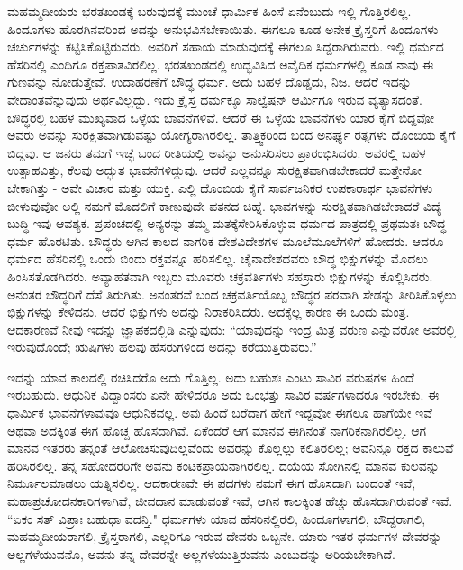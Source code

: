 ಮಹಮ್ಮದೀಯರು ಭರತಖಂಡಕ್ಕೆ ಬರುವುದಕ್ಕೆ ಮುಂಚೆ ಧಾರ್ಮಿಕ ಹಿಂಸೆ ಏನೆಂಬುದು ಇಲ್ಲಿ ಗೊತ್ತಿರಲಿಲ್ಲ. ಹಿಂದೂಗಳು ಹೊರಗಿನವರಿಂದ ಅದನ್ನು ಅನುಭವಿಸಬೇಕಾಯಿತು. ಈಗಲೂ ಕೂಡ ಅನೇಕ ಕ್ರೈಸ್ತರಿಗೆ ಹಿಂದೂಗಳು ಚರ್ಚುಗಳನ್ನು ಕಟ್ಟಿಸಿಕೊಟ್ಟಿರುವರು. ಅವರಿಗೆ ಸಹಾಯ ಮಾಡುವುದಕ್ಕೆ ಈಗಲೂ ಸಿದ್ದರಾಗಿರುವರು. ಇಲ್ಲಿ ಧರ್ಮದ ಹೆಸರಿನಲ್ಲಿ ಎಂದಿಗೂ ರಕ್ತಪಾತವಿರಲಿಲ್ಲ. ಭರತಖಂಡದಲ್ಲಿ ಉದ್ಭವಿಸಿದ ಅವೈದಿಕ ಧರ್ಮಗಳಲ್ಲಿ ಕೂಡ ನಾವು ಈ ಗುಣವನ್ನು ನೋಡುತ್ತೇವೆ. ಉದಾಹರಣೆಗೆ ಬೌದ್ಧ ಧರ್ಮ. ಅದು ಬಹಳ ದೊಡ್ಡದು, ನಿಜ. ಆದರೆ ಇದನ್ನು ವೇದಾಂತವೆನ್ನುವುದು ಅರ್ಥವಿಲ್ಲದ್ದು. ಇದು ಕ್ರೈಸ್ತ ಧರ್ಮಕ್ಕೂ ಸಾಲ್ವೆಷನ್ ಆರ್ಮಿಗೂ ಇರುವ ವ್ಯತ್ಯಾಸದಂತೆ. ಬೌದ್ಧರಲ್ಲಿ ಬಹಳ ಮುಖ್ಯವಾದ ಒಳ್ಳೆಯ ಭಾವನೆಗಳಿವೆ. ಆದರೆ ಈ ಒಳ್ಳೆಯ ಭಾವನೆಗಳು ಯಾರ ಕೈಗೆ ಬಿದ್ದವೋ ಅವರು ಅವನ್ನು ಸುರಕ್ಷಿತವಾಗಿಡುವಷ್ಟು ಯೋಗ್ಯರಾಗಿರಲಿಲ್ಲ. ತಾತ್ತ್ವಿಕರಿಂದ ಬಂದ ಅನರ್ಘ್ಯ ರತ್ನಗಳು ದೊಂಬಿಯ ಕೈಗೆ ಬಿದ್ದವು. ಆ ಜನರು ತಮಗೆ ಇಚ್ಛೆ ಬಂದ ರೀತಿಯಲ್ಲಿ ಅವನ್ನು ಅನುಸರಿಸಲು ಪ್ರಾರಂಭಿಸಿದರು. ಅವರಲ್ಲಿ ಬಹಳ ಉತ್ಸಾಹವಿತ್ತು, ಕೆಲವು ಅದ್ಭುತ ಭಾವನೆಗಳಿದ್ದುವು. ಆದರೆ ಎಲ್ಲವನ್ನೂ ಸುರಕ್ಷಿತವಾಗಿಡಬೇಕಾದರೆ ಮತ್ತೇನೋ ಬೇಕಾಗಿತ್ತು - ಅವೇ ವಿಚಾರ ಮತ್ತು ಯುಕ್ತಿ. ಎಲ್ಲಿ ದೊಂಬಿಯ ಕೈಗೆ ಸಾರ್ವಜನಿಕರ ಉಪಕಾರಾರ್ಥ ಭಾವನೆಗಳು ಬೀಳುವುವೋ ಅಲ್ಲಿ ನಮಗೆ ಮೊದಲಿಗೆ ಕಾಣುವುದೇ ಪತನದ ಚಿಹ್ನೆ. ಭಾವಗಳನ್ನು ಸುರಕ್ಷಿತವಾಗಿಡಬೇಕಾದರೆ ವಿದ್ಯೆ ಬುದ್ಧಿ ಇವು ಆವಶ್ಯಕ. ಪ್ರಪಂಚದಲ್ಲಿ ಅನ್ಯರನ್ನು ತಮ್ಮ ಮತಕ್ಕೆ\break ಸೇರಿಸಿಕೊಳ್ಳುವ ಧರ್ಮದ ಪಾತ್ರದಲ್ಲಿ ಪ್ರಥಮತಃ ಬೌದ್ಧ ಧರ್ಮ ಹೊರಟಿತು. ಬೌದ್ಧರು ಆಗಿನ ಕಾಲದ ನಾಗರಿಕ ದೇಶವಿದೇಶಗಳ ಮೂಲೆಮೂಲೆಗಳಿಗೆ ಹೋದರು. ಆದರೂ ಧರ್ಮದ ಹೆಸರಿನಲ್ಲಿ ಒಂದು ಬಿಂದು ರಕ್ತವನ್ನೂ ಹರಿಸಲಿಲ್ಲ. ಚೈನಾದೇಶದವರು ಬೌದ್ಧ ಭಿಕ್ಷುಗಳನ್ನು ಮೊದಲು ಹಿಂಸಿಸತೊಡಗಿದರು. ಅವ್ಯಾಹತವಾಗಿ ಇಬ್ಬರು ಮೂವರು ಚಕ್ರವರ್ತಿಗಳು ಸಹಸ್ರಾರು ಭಿಕ್ಷುಗಳನ್ನು ಕೊಲ್ಲಿಸಿದರು. ಅನಂತರ ಬೌದ್ಧರಿಗೆ ದೆಸೆ ತಿರುಗಿತು. ಅನಂತರವೆ ಬಂದ ಚಕ್ರವರ್ತಿಯೊಬ್ಬ ಬೌದ್ಧರ ಪರವಾಗಿ ಸೇಡನ್ನು ತೀರಿಸಿಕೊಳ್ಳಲು ಭಿಕ್ಷುಗಳನ್ನು ಕೇಳಿದನು. ಆದರೆ ಭಿಕ್ಷುಗಳು ಅದನ್ನು ನಿರಾಕರಿಸಿದರು. ಅದಕ್ಕೆಲ್ಲ ಕಾರಣ ಈ ಒಂದು ಮಂತ್ರ. ಆದಕಾರಣವೆ ನೀವು ಇದನ್ನು ಜ್ಞಾಪಕದಲ್ಲಿಡಿ ಎನ್ನುವುದು: “ಯಾವುದನ್ನು ಇಂದ್ರ ಮಿತ್ರ ವರುಣ ಎನ್ನುವರೋ ಅವರಲ್ಲಿ ಇರುವುದೊಂದೆ; ಋಷಿಗಳು ಹಲವು ಹೆಸರುಗಳಿಂದ ಅದನ್ನು ಕರೆಯುತ್ತಿರುವರು.”

ಇದನ್ನು ಯಾವ ಕಾಲದಲ್ಲಿ ರಚಿಸಿದರೊ ಅದು ಗೊತ್ತಿಲ್ಲ. ಅದು ಬಹುಶಃ ಎಂಟು ಸಾವಿರ ವರುಷಗಳ ಹಿಂದೆ ಇರಬಹುದು. ಆಧುನಿಕ ವಿದ್ವಾಂಸರು ಏನೇ ಹೇಳಿದರೂ ಅದು ಒಂಭತ್ತು ಸಾವಿರ ವರ್ಷಗಳಾದರೂ ಇರಬೇಕು. ಈ ಧಾರ್ಮಿಕ ಭಾವನೆಗಳಾವುವೂ ಆಧುನಿಕವಲ್ಲ. ಅವು ಹಿಂದೆ ಬರೆದಾಗ ಹೇಗೆ ಇದ್ದವೋ ಈಗಲೂ ಹಾಗೆಯೇ ಇವೆ ಅಥವಾ ಅದಕ್ಕಿಂತ ಈಗ ಹೊಚ್ಚ ಹೊಸದಾಗಿವೆ. ಏಕೆಂದರೆ ಆಗ ಮಾನವ ಈಗಿನಂತೆ ನಾಗರಿಕನಾಗಿರಲಿಲ್ಲ. ಆಗ ಮಾನವ ಇತರರು ತನ್ನಂತೆ ಆಲೋಚಿಸುವುದಿಲ್ಲವೆಂದು ಅವರನ್ನು ಕೊಲ್ಲಲ್ಲು ಕಲಿತಿರಲಿಲ್ಲ; ಅವನಿನ್ನೂ ರಕ್ತದ ಕಾಲುವೆ ಹರಿಸಿರಲಿಲ್ಲ. ತನ್ನ ಸಹೋದರರಿಗೇ ಅವನು ಕಂಟಕಪ್ರಾಯನಾಗಿರಲಿಲ್ಲ. ದಯೆಯ ಸೋಗಿನಲ್ಲಿ ಮಾನವ ಕುಲವನ್ನು ನಿರ್ಮೂಲಮಾಡಲು ಯತ್ನಿಸಲಿಲ್ಲ. ಆದಕಾರಣವೇ ಈ ಪದಗಳು ನಮಗೆ ಈಗ ಹೊಸದಾಗಿ ಬಂದಂತೆ ಇವೆ, ಮಹಾಪ್ರಚೋದನಕಾರಿಗಳಾಗಿವೆ, ಜೀವದಾನ ಮಾಡುವಂತೆ ಇವೆ, ಆಗಿನ ಕಾಲಕ್ಕಿಂತ ಹೆಚ್ಚು ಹೊಸದಾಗಿರುವಂತೆ ಇವೆ. “ಏಕಂ ಸತ್ ವಿಪ್ರಾಃ ಬಹುಧಾ ವದನ್ತಿ." ಧರ್ಮಗಳು ಯಾವ ಹೆಸರಿನಲ್ಲಿರಲಿ, ಹಿಂದೂಗಳಾಗಲಿ, ಬೌದ್ದರಾಗಲಿ, ಮಹಮ್ಮದೀಯರಾಗಲಿ, ಕ್ರೈಸ್ತರಾಗಲಿ, ಎಲ್ಲರಿಗೂ ಇರುವ ದೇವರು ಒಬ್ಬನೇ. ಯಾರು ಇತರ ಧರ್ಮಗಳ ದೇವರನ್ನು ಅಲ್ಲಗಳೆಯುವನೊ, ಅವನು ತನ್ನ ದೇವರನ್ನೇ ಅಲ್ಲಗಳೆಯುತ್ತಿರುವನು ಎಂಬುದನ್ನು ಅರಿಯಬೇಕಾಗಿದೆ.

